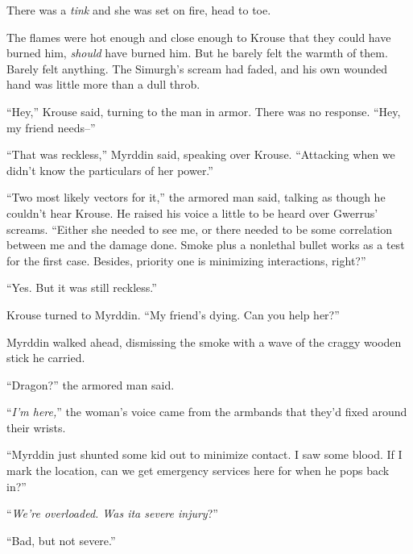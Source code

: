 There was a \emph{tink }and she was set on fire, head to toe.



The flames were hot enough and close enough to Krouse that they could have burned him, \emph{should} have burned him.  But he barely felt the warmth of them.  Barely felt anything.  The Simurgh's scream had faded, and his own wounded hand was little more than a dull throb.



``Hey,'' Krouse said, turning to the man in armor.  There was no response.  ``Hey, my friend needs--''



``That was reckless,'' Myrddin said, speaking over Krouse.  ``Attacking when we didn't know the particulars of her power.''



``Two most likely vectors for it,'' the armored man said, talking as though he couldn't hear Krouse.  He raised his voice a little to be heard over Gwerrus' screams.  ``Either she needed to see me, or there needed to be some correlation between me and the damage done.  Smoke plus a nonlethal bullet works as a test for the first case.  Besides, priority one is minimizing interactions, right?''



``Yes.  But it was still reckless.''



Krouse turned to Myrddin.  ``My friend's dying.  Can you help her?''



Myrddin walked ahead, dismissing the smoke with a wave of the craggy wooden stick he carried.



``Dragon?'' the armored man said.



``\emph{I'm here,}'' the woman's voice came from the armbands that they'd fixed around their wrists.



``Myrddin just shunted some kid out to minimize contact.  I saw some blood.  If I mark the location, can we get emergency services here for when he pops back in?''



``\emph{We're overloaded.  Was it}\emph{a severe injury}?''



``Bad, but not severe.''



